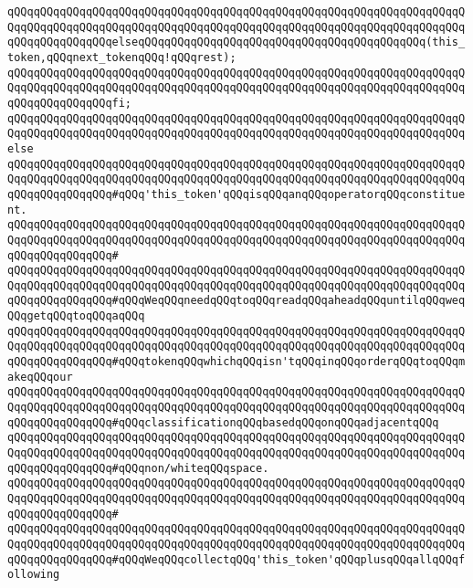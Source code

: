 \verb|qQQqqQQqqQQqqQQqqQQqqQQqqQQqqQQqqQQqqQQqqQQqqQQqqQQqqQQqqQQqqQQqqQQqqQQqqQQqqQQqqQQqqQQqqQQqqQQqqQQqqQQqqQQqqQQqqQQqqQQqqQQqqQQqqQQqqQQqqQQqqQQqqQQqqQQqqQQqelseqQQqqQQqqQQqqQQqqQQqqQQqqQQqqQQqqQQqqQQqqQQq(this_token,qQQqnext_tokenqQQq!qQQqrest);|\newline
\verb|qQQqqQQqqQQqqQQqqQQqqQQqqQQqqQQqqQQqqQQqqQQqqQQqqQQqqQQqqQQqqQQqqQQqqQQqqQQqqQQqqQQqqQQqqQQqqQQqqQQqqQQqqQQqqQQqqQQqqQQqqQQqqQQqqQQqqQQqqQQqqQQqqQQqqQQqqQQqfi;|\newline
\verb|qQQqqQQqqQQqqQQqqQQqqQQqqQQqqQQqqQQqqQQqqQQqqQQqqQQqqQQqqQQqqQQqqQQqqQQqqQQqqQQqqQQqqQQqqQQqqQQqqQQqqQQqqQQqqQQqqQQqqQQqqQQqqQQqqQQqqQQqqQQqelse|\newline
\verb|qQQqqQQqqQQqqQQqqQQqqQQqqQQqqQQqqQQqqQQqqQQqqQQqqQQqqQQqqQQqqQQqqQQqqQQqqQQqqQQqqQQqqQQqqQQqqQQqqQQqqQQqqQQqqQQqqQQqqQQqqQQqqQQqqQQqqQQqqQQqqQQqqQQqqQQqqQQq#qQQq'this_token'qQQqisqQQqanqQQqoperatorqQQqconstituent.|\newline
\verb|qQQqqQQqqQQqqQQqqQQqqQQqqQQqqQQqqQQqqQQqqQQqqQQqqQQqqQQqqQQqqQQqqQQqqQQqqQQqqQQqqQQqqQQqqQQqqQQqqQQqqQQqqQQqqQQqqQQqqQQqqQQqqQQqqQQqqQQqqQQqqQQqqQQqqQQqqQQq#|\newline
\verb|qQQqqQQqqQQqqQQqqQQqqQQqqQQqqQQqqQQqqQQqqQQqqQQqqQQqqQQqqQQqqQQqqQQqqQQqqQQqqQQqqQQqqQQqqQQqqQQqqQQqqQQqqQQqqQQqqQQqqQQqqQQqqQQqqQQqqQQqqQQqqQQqqQQqqQQqqQQq#qQQqWeqQQqneedqQQqtoqQQqreadqQQqaheadqQQquntilqQQqweqQQqgetqQQqtoqQQqaqQQq|\newline
\verb|qQQqqQQqqQQqqQQqqQQqqQQqqQQqqQQqqQQqqQQqqQQqqQQqqQQqqQQqqQQqqQQqqQQqqQQqqQQqqQQqqQQqqQQqqQQqqQQqqQQqqQQqqQQqqQQqqQQqqQQqqQQqqQQqqQQqqQQqqQQqqQQqqQQqqQQqqQQq#qQQqtokenqQQqwhichqQQqisn'tqQQqinqQQqorderqQQqtoqQQqmakeqQQqour|\newline
\verb|qQQqqQQqqQQqqQQqqQQqqQQqqQQqqQQqqQQqqQQqqQQqqQQqqQQqqQQqqQQqqQQqqQQqqQQqqQQqqQQqqQQqqQQqqQQqqQQqqQQqqQQqqQQqqQQqqQQqqQQqqQQqqQQqqQQqqQQqqQQqqQQqqQQqqQQqqQQq#qQQqclassificationqQQqbasedqQQqonqQQqadjacentqQQq|\newline
\verb|qQQqqQQqqQQqqQQqqQQqqQQqqQQqqQQqqQQqqQQqqQQqqQQqqQQqqQQqqQQqqQQqqQQqqQQqqQQqqQQqqQQqqQQqqQQqqQQqqQQqqQQqqQQqqQQqqQQqqQQqqQQqqQQqqQQqqQQqqQQqqQQqqQQqqQQqqQQq#qQQqnon/whiteqQQqspace.|\newline
\verb|qQQqqQQqqQQqqQQqqQQqqQQqqQQqqQQqqQQqqQQqqQQqqQQqqQQqqQQqqQQqqQQqqQQqqQQqqQQqqQQqqQQqqQQqqQQqqQQqqQQqqQQqqQQqqQQqqQQqqQQqqQQqqQQqqQQqqQQqqQQqqQQqqQQqqQQqqQQq#|\newline
\verb|qQQqqQQqqQQqqQQqqQQqqQQqqQQqqQQqqQQqqQQqqQQqqQQqqQQqqQQqqQQqqQQqqQQqqQQqqQQqqQQqqQQqqQQqqQQqqQQqqQQqqQQqqQQqqQQqqQQqqQQqqQQqqQQqqQQqqQQqqQQqqQQqqQQqqQQqqQQq#qQQqWeqQQqcollectqQQq'this_token'qQQqplusqQQqallqQQqfollowing|\newline
